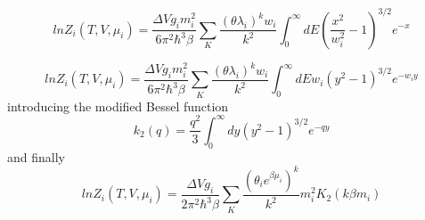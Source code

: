 \documentclass[12pt,a4paper]{book}
\begin{document}
	\begin{equation}
		ln Z_i(T,V,\mu_i)= \frac{\Delta V g_i m_i^2}{6 \pi^2\hbar^3 \beta} \sum_{K} \frac{(\theta \lambda_i)^k w_i}{k^2}  \int_{0}^{\infty} dE (\frac{x^2}{w_i^2}-1)^{3/2} e^{-x} 
	\end{equation}
	
	\begin{equation}
		ln Z_i(T,V,\mu_i)= \frac{\Delta V g_i m_i^2}{6 \pi^2\hbar^3 \beta} \sum_{K} \frac{(\theta \lambda_i)^k w_i}{k^2}  \int_{0}^{\infty} dE w_i (y^2-1)^{3/2} e^{-w_i y} 
	\end{equation}
	introducing the modified Bessel function 
	\begin{equation}
		k_2(q)= \frac{q^2}{3} \int_{0}^{\infty} dy (y^2-1)^{3/2} e^{-qy}
	\end{equation}
	and finally 
	\begin{equation}
		ln Z_i(T,V,\mu_i)= \frac{\Delta V g_i}{2\pi^2\hbar^3\beta} \sum_{K} \frac{(\theta_i e^{\beta \mu_i})^k}{k^2} m_i^2K_2(k\beta m_i)
	\end{equation}
	
	\printbibliography	
\end{document}
